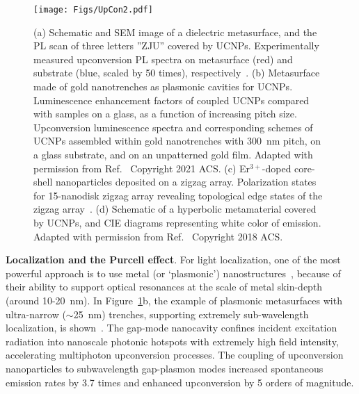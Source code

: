 \documentclass[journal=chreay,manuscript=review]{achemso}
\begin{document}
\begin{figure}
    \centering
    \texttt{[image: Figs/UpCon2.pdf]}
    \caption{
    (a) Schematic and SEM image of a dielectric metasurface, and the PL scan of three letters ''ZJU'' covered by UCNPs. Experimentally measured upconversion PL spectra on metasurface (red) and substrate (blue, scaled by 50 times), respectively~\cite{gong2019upconversion}. (b) Metasurface made of gold nanotrenches as plasmonic cavities for UCNPs. Luminescence enhancement factors of coupled UCNPs compared with samples on a glass, as a function of increasing pitch size. Upconversion luminescence spectra and corresponding schemes of UCNPs assembled within gold nanotrenches with 300~nm pitch, on a glass substrate, and on an unpatterned gold film. Adapted with permission from Ref.~ Copyright 2021 ACS. (c) Er$^{3+}$-doped core-shell nanoparticles deposited on a zigzag array. Polarization states for 15-nanodisk zigzag array revealing topological edge states of the zigzag array~\cite{tripathi2021topological}. (d) Schematic of a hyperbolic metamaterial covered by UCNPs, and CIE diagrams representing white color of emission. Adapted with permission from Ref.~ Copyright 2018 ACS.}
    \label{fig:upcon2}
\end{figure}

{\bf Localization and the Purcell effect}. For light localization, one of the most powerful approach is to use metal (or `plasmonic') nanostructures~\cite{schuller2010plasmonics, jiang2017active, kravets2018plasmonic}, because of their ability to support optical resonances at the scale of metal skin-depth (around 10-20~nm). In Figure~\ref{fig:upcon2}b, the example of plasmonic metasurfaces with ultra-narrow ($\sim$25~nm) trenches, supporting extremely sub-wavelength localization, is shown~\cite{xu2021multiphoton}. The gap-mode nanocavity confines incident excitation radiation into nanoscale photonic hotspots with extremely high field intensity, accelerating multiphoton upconversion processes. The coupling of upconversion nanoparticles to subwavelength gap-plasmon modes increased spontaneous emission rates by 3.7 times and enhanced upconversion by 5 orders of magnitude. 
\end{document}
